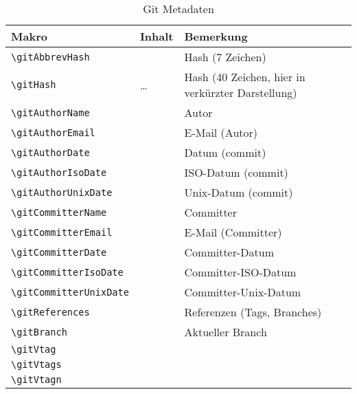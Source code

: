 %
%
	\label{sec:Gitinfo2}



\begin{table}[b]
	\caption{Git Metadaten}
	\footnotesize
	\begin{tabularx}{\textwidth}{lFF} \hline
		Makro & Inhalt & Bemerkung \\ \hline
		\verb_\gitAbbrevHash_ &
			\gitAbbrevHash &
			Hash (7 Zeichen) \\
		\verb_\gitHash_ &
			\gitAbbrevHash\ldots &
			Hash (40 Zeichen, hier in verkürzter Darstellung) \\ \hline
		\verb_\gitAuthorName_ &
			\gitAuthorName &
			Autor \\
		\verb_\gitAuthorEmail_ &
			\gitAuthorEmail &
			E-Mail (Autor) \\
		\verb_\gitAuthorDate_ &
			\gitAuthorDate &
			Datum (commit) \\
		\verb_\gitAuthorIsoDate_ &
			\gitAuthorIsoDate &
			ISO-Datum (commit) \\
		\verb_\gitAuthorUnixDate_ &
			\gitAuthorUnixDate &
			Unix-Datum (commit) \\ \hline
		\verb_\gitCommitterName_ &
			\gitCommitterName &
			Committer \\
		\verb_\gitCommitterEmail_ &
			\gitCommitterEmail &
			E-Mail (Committer) \\
		\verb_\gitCommitterDate_ &
			\gitCommitterDate &
			Committer-Datum \\
		\verb_\gitCommitterIsoDate_ &
			\gitCommitterIsoDate &
			Committer-ISO-Datum \\
		\verb_\gitCommitterUnixDate_ &
			\gitCommitterUnixDate &
			Committer-Unix-Datum \\ \hline
		\verb_\gitReferences_ &
			\gitReferences &
			Referenzen (Tags, Branches) \\
		\verb_\gitBranch_ &
			\gitBranch &
			Aktueller Branch \\ \hline
		\verb_\gitVtag_ &
			\gitVtag &
			\\
		\verb_\gitVtags_ &
			\gitVtags &
			\\
		\verb_\gitVtagn_ &
			\gitVtagn &
			\\ \hline

\end{tabularx}
\end{table}

